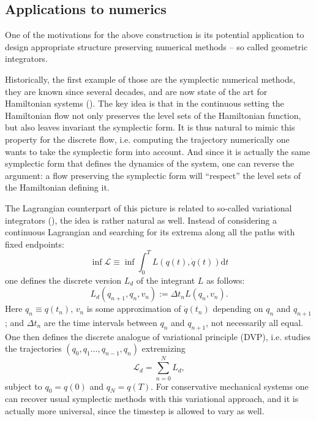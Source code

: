 \documentclass[a4paper,12pt]{amsart}
\theoremstyle{definition}
\newcommand{\rd}{\mathrm{d}}
\begin{document}
\subsection{Applications to numerics} \label{sec:num}


One of the motivations for the above construction is its potential application to design appropriate structure preserving numerical methods -- so called geometric integrators. 

Historically, the first example of those are the symplectic numerical methods, they are known since several decades, and are now state of the art for Hamiltonian systems (\cite{yoshida}). The key idea is that in the continuous setting the Hamiltonian flow not only preserves the level sets of the Hamiltonian function, but also leaves invariant the symplectic form. It is thus natural to mimic this property for the discrete flow, i.e. computing the trajectory numerically one wants to take the symplectic form into account. And since it is actually the same symplectic form that defines the dynamics of the system, one can reverse the argument: a flow preserving the symplectic form will ``respect'' the level sets of the Hamiltonian defining it. 

The Lagrangian counterpart of this picture is related to so-called variational integrators (\cite{MaWe}), the idea is rather natural as well. Instead of considering a continuous Lagrangian and searching for its extrema along all the paths with fixed endpoints:
\begin{equation} \label{var_pr}
  \inf \mathcal{L} \equiv  \inf \int_{0}^T L(q(t), \dot q(t)) \rd t 
\end{equation}
one defines the discrete version {$L_d$ of the integrant $L$ as follows:}
$$
  L_d (q_{n+1}, q_n, v_n) := \Delta t_n L(q_n, v_n).
$$
Here $q_n \equiv q(t_n)$, $v_n$ is some approximation of $\dot q(t_n)$ depending on $q_n$ and $q_{n+1}$; and $\Delta t_n$ are the time intervals between $q_n$ and $q_{n+1}$, not necessarily all equal. One then defines the discrete analogue of variational principle (DVP), i.e. studies the trajectories $(q_0, q_1 \dots, q_{n-1}, q_n)$  extremizing 
$$
  \mathcal{L}_d = \sum_{n=0}^N L_d, 
$$
subject to $q_0 = q(0)$ and $q_N = q(T)$. 
For conservative mechanical systems one can recover usual symplectic methods with this variational approach, and it is actually more universal, since the timestep is allowed to vary as well. 
\end{document}
